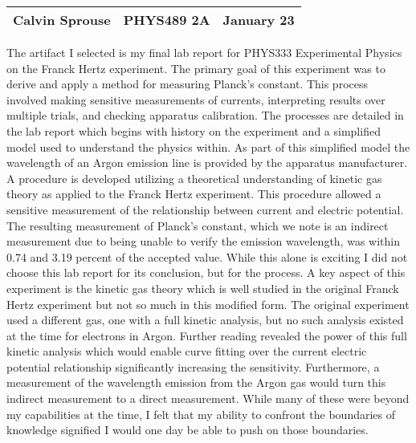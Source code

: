 \documentclass[a4paper, 12pt]{config/homework}
\begin{document}
\noindent
\begin{tabularx}{\textwidth}{>{\centering\arraybackslash}X>{\centering\arraybackslash}X>{\centering\arraybackslash}X}
Calvin Sprouse & PHYS489 2A & 2024 January 23\\
\midrule
\end{tabularx}



The artifact I selected is my final lab report for PHYS333 Experimental Physics on the Franck Hertz experiment. The primary goal of this experiment was to derive and apply a method for measuring Planck's constant. This process involved making sensitive measurements of currents, interpreting results over multiple trials, and checking apparatus calibration. The processes are detailed in the lab report which begins with history on the experiment and a simplified model used to understand the physics within. As part of this simplified model the wavelength of an Argon emission line is provided by the apparatus manufacturer. A procedure is developed utilizing a theoretical understanding of kinetic gas theory as applied to the Franck Hertz experiment. This procedure allowed a sensitive measurement of the relationship between current and electric potential. The resulting measurement of Planck's constant, which we note is an indirect measurement due to being unable to verify the emission wavelength, was within 0.74 and 3.19 percent of the accepted value. While this alone is exciting I did not choose this lab report for its conclusion, but for the process. A key aspect of this experiment is the kinetic gas theory which is well studied in the original Franck Hertz experiment but not so much in this modified form. The original experiment used a different gas, one with a full kinetic analysis, but no such analysis existed at the time for electrons in Argon. Further reading revealed the power of this full kinetic analysis which would enable curve fitting over the current electric potential relationship significantly increasing the sensitivity. Furthermore, a measurement of the wavelength emission from the Argon gas would turn this indirect measurement to a direct measurement. While many of these were beyond my capabilities at the time, I felt that my ability to confront the boundaries of knowledge signified I would one day be able to push on those boundaries.


\end{document}
